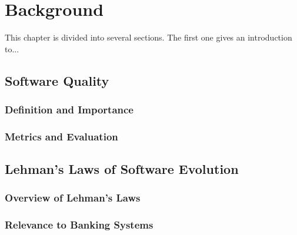 
%

\chapter{Background}
\label{cha:Background}


This chapter is divided into several sections. The first one gives an introduction to...


\section{Software Quality}
\cite{MetricsMaintainability1994}
\cite{ManagingMaintenance1983}
\cite{lientz1980software}
\cite{MaintenanceGlass1998}
    
\subsection{Definition and Importance}



\subsection{Metrics and Evaluation}



\section{Lehman’s Laws of Software Evolution}

\cite{LehmanLaws1980}
\cite{Lehman1978ProgramsCS}
\cite{Lehman1996Laws}
\cite{SoftwareEvolution2010}

\subsection{Overview of Lehman’s Laws}



\subsection{Relevance to Banking Systems}








